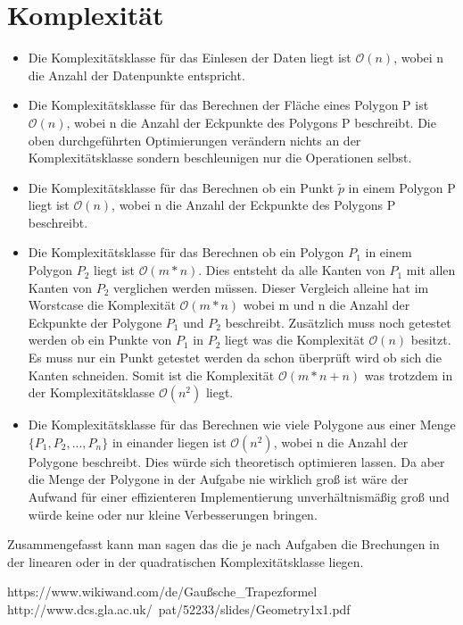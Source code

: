 \documentclass[conference]{IEEEtran}
\begin{document}
	
	\section{Komplexität}
	\begin{itemize}
		\item Die Komplexitätsklasse für das Einlesen der Daten liegt ist $\mathcal{O}(n)$, wobei n die Anzahl der Datenpunkte entspricht.
		
		\item Die Komplexitätsklasse für das Berechnen der Fläche eines Polygon P ist $\mathcal{O}(n)$, wobei n die Anzahl der Eckpunkte des Polygons P beschreibt. Die oben durchgeführten Optimierungen verändern nichts an der Komplexitätsklasse sondern beschleunigen nur die Operationen selbst.
		
		\item Die Komplexitätsklasse für das Berechnen ob ein Punkt $\tilde{p}$ in einem Polygon P liegt ist $\mathcal{O}(n)$, wobei n die Anzahl der Eckpunkte des Polygons P beschreibt.
		
		\item Die Komplexitätsklasse für das Berechnen ob ein Polygon $P_1$ in einem Polygon $P_2$ liegt ist $\mathcal{O}(m*n)$. Dies entsteht da alle Kanten von $P_1$ mit allen Kanten von $P_2$ verglichen werden müssen. Dieser Vergleich alleine hat im Worstcase die Komplexität $\mathcal{O}(m*n)$  wobei m und n die Anzahl der Eckpunkte der Polygone $P_1$ und $P_2$ beschreibt. Zusätzlich muss noch getestet werden ob ein Punkte von $P_1$ in $P_2$ liegt was die Komplexität $\mathcal{O}(n)$ besitzt. Es muss nur ein Punkt getestet werden da schon überprüft wird ob sich die Kanten schneiden. Somit ist die Komplexität $\mathcal{O}(m*n+n)$ was trotzdem in der Komplexitätsklasse $\mathcal{O}(n^2)$ liegt.
		
		\item Die Komplexitätsklasse für das Berechnen wie viele Polygone aus einer Menge $\{P_1,P_2,...,P_n\}$ in einander liegen ist $\mathcal{O}(n^2)$, wobei n die Anzahl der Polygone beschreibt. Dies würde sich theoretisch optimieren lassen. Da aber die Menge der Polygone in der Aufgabe nie wirklich groß ist wäre der Aufwand für einer effizienteren Implementierung unverhältnismäßig groß und würde keine oder nur kleine Verbesserungen bringen.
	\end{itemize}
	Zusammengefasst kann man sagen das die je nach Aufgaben die Brechungen in der linearen oder in der quadratischen Komplexitätsklasse liegen.
	
	\begin{thebibliography}{00}
		https://www.wikiwand.com/de/Gaußsche\_Trapezformel
		http://www.dcs.gla.ac.uk/~pat/52233/slides/Geometry1x1.pdf
	\end{thebibliography}
	
\end{document}

